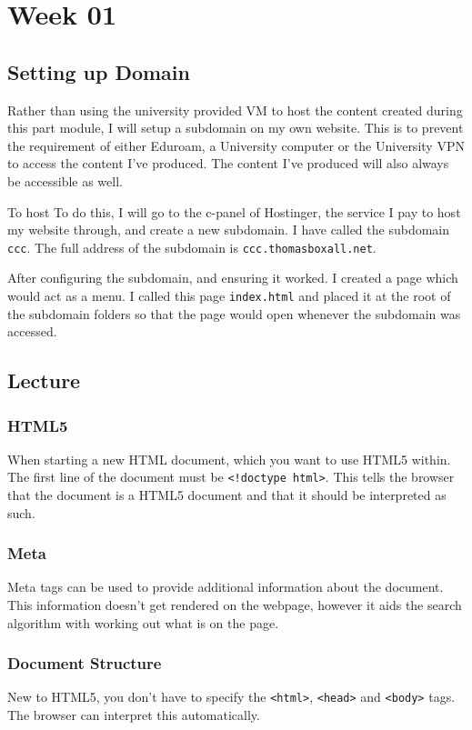 \chapter{Week 01}

\section{Setting up Domain}
Rather than using the university provided VM to host the content created during this part module, I will setup a subdomain on my own website. This is to prevent the requirement of either Eduroam, a University computer or the University VPN to access the content I've produced. The content I've produced will also always be accessible as well.

To host To do this, I will go to the c-panel of Hostinger, the service I pay to host my website through, and create a new subdomain. I have called the subdomain \texttt{ccc}. The full address of the subdomain is \texttt{ccc.thomasboxall.net}.

After configuring the subdomain, and ensuring it worked. I created a page which would act as a menu. I called this page \texttt{index.html} and placed it at the root of the subdomain folders so that the page would open whenever the subdomain was accessed. 

\section{Lecture}
\subsection{HTML5}
When starting a new HTML document, which you want to use HTML5 within. The first line of the document must be \texttt{<!doctype html>}. This tells the browser that the document is a HTML5 document and that it should be interpreted as such.
\subsection{Meta}
Meta tags can be used to provide additional information about the document. This information doesn't get rendered on the webpage, however it aids the search algorithm with working out what is on the page.

\subsection{Document Structure}
New to HTML5, you don't have to specify the \texttt{<html>}, \texttt{<head>} and \texttt{<body>} tags. The browser can interpret this automatically.

